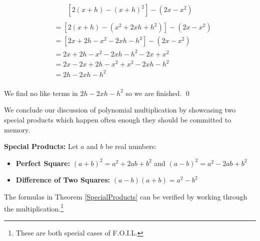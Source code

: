 \begin{ex}
\begin{enumerate}
\begin{multline*}
  \left[2(x+h) - (x+h)^2\right] - \left(2x - x^2 \right) \\
\end{multline*}
\begin{align*}
& = \left[2(x+h) - \left( x^2 + 2xh + h^2\right) \right] - \left(2x - x^2 \right) \tag{Substitute} \\
& = \left[2x+2h - x^2-2xh-h^2\right] - \left(2x - x^2 \right) \tag{Distribute}\\ 
& = 2x+2h - x^2-2xh-h^2 -2x + x^2 \tag{Distribute} \\ 
& = 2x - 2x+2h - x^2 + x^2 -2xh-h^2 \tag{Rearrange terms}\\
& = 2h-2xh-h^2 \tag{Combine like terms}\\
\end{align*}
                              
We find no like terms in $2h-2xh-h^2$ so we are finished. \qed                                               

\end{enumerate}

\end{ex}

We conclude our discussion of polynomial multiplication by showcasing two special products which happen often enough they should be committed to memory.

\begin{tcolorbox}
  
\begin{thm}\label{SpecialProducts} \textbf{Special Products:} Let $a$ and $b$ be real numbers:

\begin{itemize}

\item \textbf{Perfect Square:}  $(a+b)^2 = a^2 + 2ab + b^2$ and $(a-b)^2 = a^2 - 2ab + b^2$

\item \textbf{Difference of Two Squares:}  $(a-b)(a+b) = a^2 - b^2$ 

\end{itemize}

\end{thm}

\end{tcolorbox}

The formulas in Theorem \ref{SpecialProducts} can be verified by working through the multiplication.\footnote{These are both special cases of F.O.I.L.}

